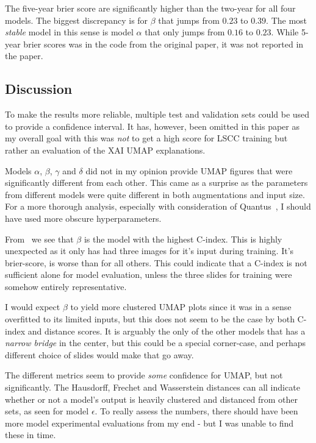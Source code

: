 \documentclass[10pt,twocolumn,letterpaper]{article}
\begin{document}
The five-year brier score are significantly higher than the two-year for all four models. The biggest discrepancy is for $\beta$ that jumps from $0.23$ to $0.39$. The most \textit{stable} model in this sense is model $\alpha$ that only jumps from $0.16$ to $0.23$. While 5-year brier scores was in the code from the original paper, it was not reported in the paper.

\subsection{Discussion}\label{sec:discussion}
To make the results more reliable, multiple test and validation sets could be used to provide a confidence interval. It has, however, been omitted in this paper as my overall goal with this was \textit{not} to get a high score for \gls{LSCC} training but rather an evaluation of the \gls{XAI} \gls{UMAP} explanations.

Models $\alpha$, $\beta$, $\gamma$ and $\delta$ did not in my opinion provide \gls{UMAP} figures that were significantly different from each other. This came as a surprise as the parameters from different models were quite different in both augmentations and input size. For a more thorough analysis, especially with consideration of Quantus~\cite{hedstrom2023quantus}, I should have used more obscure hyperparameters. 

From~ we see that $\beta$ is the model with the highest C-index. This is highly unexpected as it only has had three images for it's input during training. It's brier-score, is worse than for all others. This could indicate that a C-index is not sufficient alone for model evaluation, unless the three slides for training were somehow entirely representative.

I would expect $\beta$ to yield more clustered \gls{UMAP} plots since it was in a sense overfitted to its limited inputs, but this does not seem to be the case by both C-index and distance scores. It is arguably the only of the other models that has a \textit{narrow bridge} in the center, but this could be a special corner-case, and perhaps different choice of slides would make that go away.

The different metrics seem to provide \textit{some} confidence for \gls{UMAP}, but not significantly. The Hausdorff, Frechet and Wasserstein distances can all indicate whether or not a model's output is heavily clustered and distanced from other sets, as seen for model $\epsilon$. To really assess the numbers, there should have been more model experimental evaluations from my end - but I was unable to find these in time.
\end{document}
